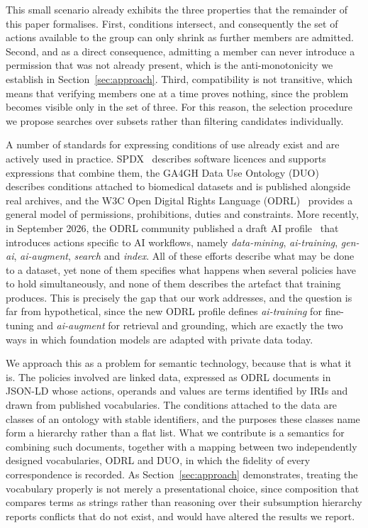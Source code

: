 \documentclass[sigconf,anonymous,review]{acmart}
\begin{document}
This small scenario already exhibits the three properties that the remainder of
this paper formalises. First, conditions intersect, and consequently the set of
actions available to the group can only shrink as further members are admitted.
Second, and as a direct consequence, admitting a member can never introduce a
permission that was not already present, which is the anti-monotonicity we
establish in Section~\ref{sec:approach}. Third, compatibility is not transitive,
which means that verifying members one at a time proves nothing, since the
problem becomes visible only in the set of three. For this reason, the selection
procedure we propose searches over subsets rather than filtering candidates
individually.

A number of standards for expressing conditions of use already exist and are
actively used in practice. SPDX~\cite{spdx} describes software licences and
supports expressions that combine them, the GA4GH Data Use Ontology
(DUO)~\cite{duo} describes conditions attached to biomedical datasets and is
published alongside real archives, and the W3C Open Digital Rights Language
(ODRL)~\cite{odrl-model,odrl-vocab} provides a general model of permissions,
prohibitions, duties and constraints. More recently, in September 2026, the ODRL
community published a draft AI profile~\cite{odrl-ai} that introduces actions
specific to AI workflows, namely \emph{data-mining}, \emph{ai-training},
\emph{gen-ai}, \emph{ai-augment}, \emph{search} and \emph{index}. All of these
efforts describe what may be done to a dataset, yet none of them specifies what
happens when several policies have to hold simultaneously, and none of them
describes the artefact that training produces. This is precisely the gap that our
work addresses, and the question is far from hypothetical, since the new ODRL
profile defines \emph{ai-training} for fine-tuning and \emph{ai-augment} for
retrieval and grounding, which are exactly the two ways in which foundation
models are adapted with private data today.

We approach this as a problem for semantic technology, because that is what it
is. The policies involved are linked data, expressed as ODRL documents in JSON-LD
whose actions, operands and values are terms identified by IRIs and drawn from
published vocabularies. The conditions attached to the data are classes of an
ontology with stable identifiers, and the purposes these classes name form a
hierarchy rather than a flat list. What we contribute is a semantics for
combining such documents, together with a mapping between two independently
designed vocabularies, ODRL and DUO, in which the fidelity of every
correspondence is recorded. As Section~\ref{sec:approach} demonstrates, treating
the vocabulary properly is not merely a presentational choice, since composition
that compares terms as strings rather than reasoning over their subsumption
hierarchy reports conflicts that do not exist, and would have altered the results
we report.
\end{document}
